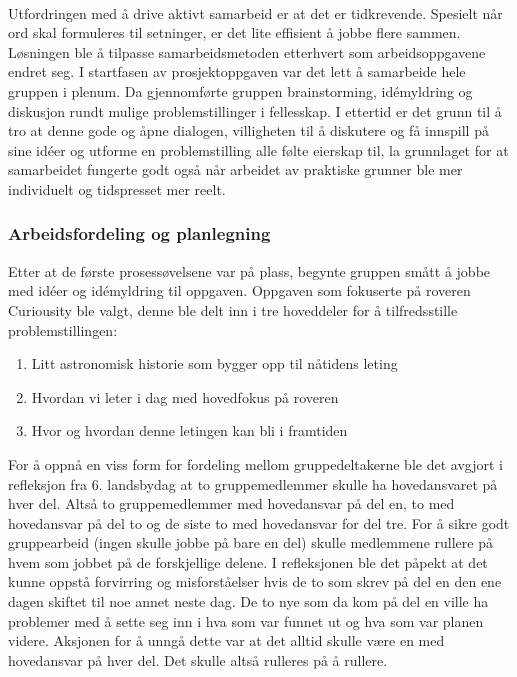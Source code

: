 \\
Utfordringen med å drive aktivt samarbeid er at det er tidkrevende.
Spesielt når ord skal formuleres til setninger, er det lite effisient å jobbe flere sammen.
Løsningen ble å tilpasse samarbeidsmetoden etterhvert som arbeidsoppgavene endret seg.
I startfasen av prosjektoppgaven var det lett å samarbeide hele gruppen i plenum.
Da gjennomførte gruppen brainstorming, id\'{e}myldring og diskusjon rundt mulige problemstillinger i fellesskap.
I ettertid er det grunn til å tro at denne gode og åpne dialogen, villigheten til å diskutere og få innspill på sine id\'{e}er og utforme en problemstilling alle følte eierskap til, la grunnlaget for at samarbeidet fungerte godt også når arbeidet av praktiske grunner ble mer individuelt og tidspresset mer reelt.
\\
\subsubsection{Arbeidsfordeling og planlegning}
Etter at de første prosessøvelsene var på plass, begynte gruppen smått å jobbe med id\'{e}er og id\'{e}myldring til oppgaven.
Oppgaven som fokuserte på roveren Curiousity ble valgt, denne ble delt inn i tre hoveddeler for å tilfredsstille problemstillingen:
\begin{enumerate}
\item Litt astronomisk historie som bygger opp til nåtidens leting
\item Hvordan vi leter i dag med hovedfokus på roveren
\item Hvor og hvordan denne letingen kan bli i framtiden
\end{enumerate}
For å oppnå en viss form for fordeling mellom gruppedeltakerne ble det avgjort i refleksjon fra 6. landsbydag at to gruppemedlemmer skulle ha hovedansvaret på hver del.
Altså to gruppemedlemmer med hovedansvar på del en, to med hovedansvar på del to og de siste to med hovedansvar for del tre.
For å sikre godt gruppearbeid (ingen skulle jobbe på bare en del) skulle medlemmene rullere på hvem som jobbet på de forskjellige delene.
I refleksjonen ble det påpekt at det kunne oppstå forvirring og misforståelser hvis de to som skrev på del en den ene dagen skiftet til noe annet neste dag.
De to nye som da kom på del en ville ha problemer med å sette seg inn i hva som var funnet ut og hva som var planen videre.
Aksjonen for å unngå dette var at det alltid skulle være en med hovedansvar på hver del.
Det skulle altså rulleres på å rullere.
\\
